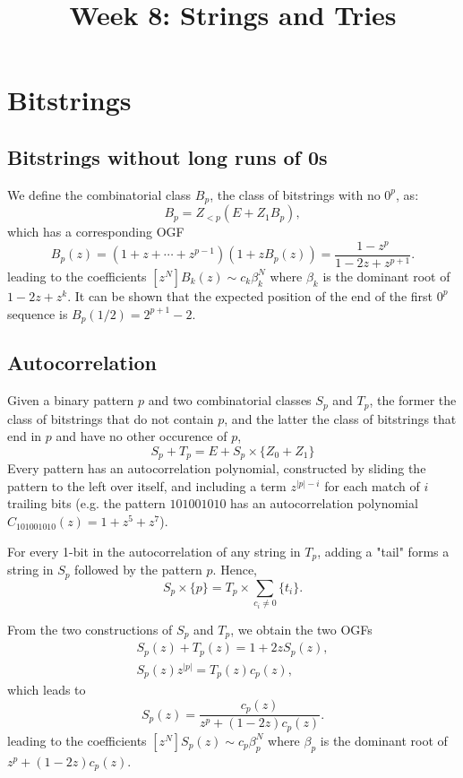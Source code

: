 \documentclass{article}
\begin{document}
\title{Week 8: Strings and Tries}
\maketitle

\section{Bitstrings}

\subsection{Bitstrings without long runs of 0s}

We define the combinatorial class $B_p$, the class of bitstrings with no $0^p$,
as: \[
  B_p = Z_{< p}(E + Z_1 B_p),
\] which has a corresponding OGF \[
  B_p(z) = (1 + z + \cdots + z^{p - 1})(1 + zB_p(z))
  = \frac{1 - z^p}{1 - 2z + z^{p + 1}}.
\] leading to the coefficients $[z^N]B_k(z) \sim c_k \beta_k^N$ where $\beta_k$
is the dominant root of $1 - 2z + z^k$. It can be shown that the expected
position of the end of the first $0^p$ sequence is $B_p(1/2) = 2^{p + 1} - 2$.

\subsection{Autocorrelation}

Given a binary pattern $p$ and two combinatorial classes $S_p$ and $T_p$, the
former the class of bitstrings that do not contain $p$, and the latter the
class of bitstrings that end in $p$ and have no other occurence of $p$, \[
  S_p + T_p = E + S_p \times \{Z_0 + Z_1\}
\] Every pattern has an autocorrelation polynomial, constructed by sliding the
pattern to the left over itself, and including a term $z^{|p| - i}$ for each
match of $i$ trailing bits (e.g. the pattern $101001010$ has an autocorrelation
polynomial $C_{101001010}(z) = 1 + z^5 + z^7$).

For every 1-bit in the autocorrelation of any string in $T_p$, adding a "tail"
forms a string in $S_p$ followed by the pattern $p$. Hence, \[
  S_p \times \{p\} = T_p \times \sum_{c_i \neq 0} \{t_i\}.
\]

From the two constructions of $S_p$ and $T_p$, we obtain the two OGFs
\begin{gather*}
  S_p(z) + T_p(z) = 1 + 2zS_p(z), \\
  S_p(z)z^{|p|} = T_p(z)c_p(z),
\end{gather*} which leads to \[
  S_p(z) = \frac{c_p(z)}{z^p + (1 - 2z)c_p(z)}.
\] leading to the coefficients $[z^N]S_p(z) \sim c_p \beta_p^N$ where $\beta_p$
is the dominant root of $z^p + (1 - 2z)c_p(z)$.
\end{document}
